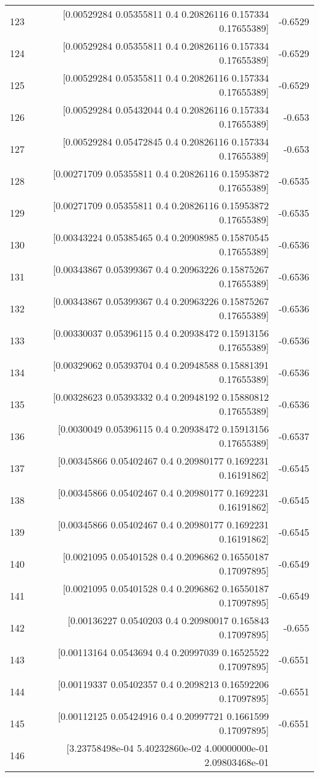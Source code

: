 \begin{longtable}{lrr}
123 & [0.00529284 0.05355811 0.4        0.20826116 0.157334   0.17655389] & -0.6529 \\
124 & [0.00529284 0.05355811 0.4        0.20826116 0.157334   0.17655389] & -0.6529 \\
125 & [0.00529284 0.05355811 0.4        0.20826116 0.157334   0.17655389] & -0.6529 \\
126 & [0.00529284 0.05432044 0.4        0.20826116 0.157334   0.17655389] & -0.653 \\
127 & [0.00529284 0.05472845 0.4        0.20826116 0.157334   0.17655389] & -0.653 \\
128 & [0.00271709 0.05355811 0.4        0.20826116 0.15953872 0.17655389] & -0.6535 \\
129 & [0.00271709 0.05355811 0.4        0.20826116 0.15953872 0.17655389] & -0.6535 \\
130 & [0.00343224 0.05385465 0.4        0.20908985 0.15870545 0.17655389] & -0.6536 \\
131 & [0.00343867 0.05399367 0.4        0.20963226 0.15875267 0.17655389] & -0.6536 \\
132 & [0.00343867 0.05399367 0.4        0.20963226 0.15875267 0.17655389] & -0.6536 \\
133 & [0.00330037 0.05396115 0.4        0.20938472 0.15913156 0.17655389] & -0.6536 \\
134 & [0.00329062 0.05393704 0.4        0.20948588 0.15881391 0.17655389] & -0.6536 \\
135 & [0.00328623 0.05393332 0.4        0.20948192 0.15880812 0.17655389] & -0.6536 \\
136 & [0.0030049  0.05396115 0.4        0.20938472 0.15913156 0.17655389] & -0.6537 \\
137 & [0.00345866 0.05402467 0.4        0.20980177 0.1692231  0.16191862] & -0.6545 \\
138 & [0.00345866 0.05402467 0.4        0.20980177 0.1692231  0.16191862] & -0.6545 \\
139 & [0.00345866 0.05402467 0.4        0.20980177 0.1692231  0.16191862] & -0.6545 \\
140 & [0.0021095  0.05401528 0.4        0.2096862  0.16550187 0.17097895] & -0.6549 \\
141 & [0.0021095  0.05401528 0.4        0.2096862  0.16550187 0.17097895] & -0.6549 \\
142 & [0.00136227 0.0540203  0.4        0.20980017 0.165843   0.17097895] & -0.655 \\
143 & [0.00113164 0.0543694  0.4        0.20997039 0.16525522 0.17097895] & -0.6551 \\
144 & [0.00119337 0.05402357 0.4        0.2098213  0.16592206 0.17097895] & -0.6551 \\
145 & [0.00112125 0.05424916 0.4        0.20997721 0.1661599  0.17097895] & -0.6551 \\
146 & [3.23758498e-04 5.40232860e-02 4.00000000e-01 2.09803468e-01


\end{longtable}
